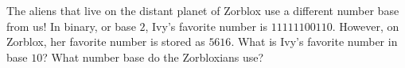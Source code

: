The aliens that live on the distant planet of Zorblox use a different number base from us! In binary, or base $2$, Ivy's favorite number is $11111100110$. However, on Zorblox, her favorite number is stored as $5616$. What is Ivy's favorite number in base $10$? What number base do the Zorbloxians use?
